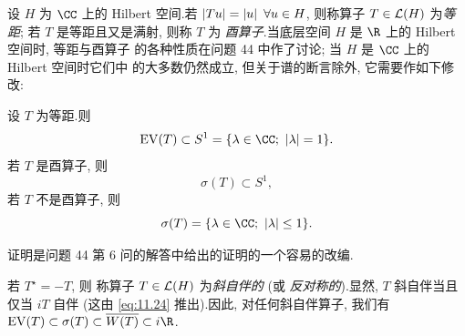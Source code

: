 设 $H$ 为 $\CC$ 上的 Hilbert 空间.若 $\left|Tu\right|=\left|u\right|\ \forall u\in H$,
则称算子 $T\in\mathcal{L}(H)$ 为\emph{等距}; 若 $T$ 是等距且又是满射, 则称 $T$
为\emph{
酉算子}.当底层空间 $H$ 是 $\R$ 上的 Hilbert 空间时, 等距与酉算子
的各种性质在问题 44 中作了讨论; 当 $H$ 是 $\CC$ 上的 Hilbert 空间时它们中
的大多数仍然成立, 但关于谱的断言除外, 它需要作如下修改:

\begin{proposition}
\label{prop:11.37}
设 $T$ 为等距.则
\begin{equation*}
\operatorname{EV}(T)\subset S^1=\{\lambda\in\CC;\ \abs{\lambda}=1\}.
\end{equation*}
若 $T$ 是酉算子, 则
\begin{equation*}
\sigma(T)\subset S^1,
\end{equation*}
若 $T$ 不是酉算子, 则
\begin{equation*}
\sigma(T)=\{\lambda\in\CC;\ \abs{\lambda}\le1\}.
\end{equation*}
\end{proposition}

证明是问题 44 第 6 问的解答中给出的证明的一个容易的改编.

若 $T^\star=-T$, 则
称算子 $T\in\mathcal{L}(H)$ 为\emph{斜自伴的} (或
\emph{反对称的}).显然, $T$ 斜自伴当且仅当 $iT$ 自伴 (这由 \eqref{eq:11.24}
推出).因此, 对任何斜自伴算子, 我们有
$\operatorname{EV}(T)\subset\sigma(T)\subset\overline{W(T)}\subset i\R$.
